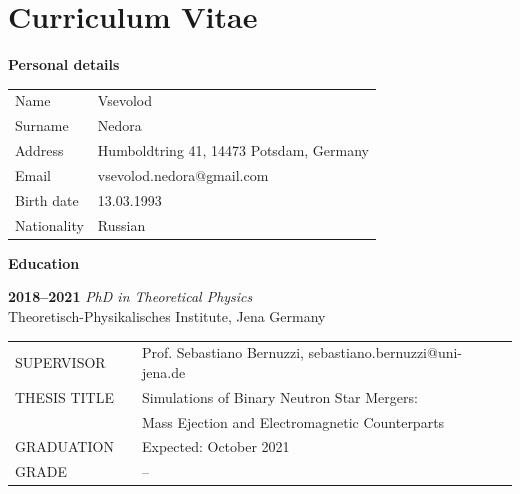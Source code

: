 \documentclass[
openright,
12pt, %
english,%
onehalfspacing, %
nolistspacing, %
nohyperref, %
headsepline, %
]{MastersDoctoralThesis} %
\begin{document}
\newpage 
\pagestyle{plain}
\section*{Curriculum Vitae}

\vspace*{1cm}
\noindent \textbf{Personal details} 
\vspace*{-0.2cm}

\begin{table}[h!]
    \begin{small}
     \begin{tabular}{ll}
        Name        & Vsevolod  \\
        Surname     & Nedora \\
        Address     & Humboldtring 41, 14473 Potsdam, Germany \\
        Email       & vsevolod.nedora$@$gmail.com \\
        Birth date  & 13.03.1993 \\
        Nationality & Russian \\
    \end{tabular}
    \end{small}
\end{table}

\vspace*{0.2cm}
\noindent


\noindent \textbf{Education}
\vspace*{-0.2cm}


\noindent \textbf{2018--2021} \textit{PhD in Theoretical Physics} \\
Theoretisch-Physikalisches Institute, Jena Germany \\
\begin{tabular}{l l l}
    \hspace{3mm}S\footnotesize{UPERVISOR}   & \hspace{2mm} & Prof. Sebastiano Bernuzzi, sebastiano.bernuzzi@uni-jena.de \\
    \hspace{3mm}T\footnotesize{HESIS TITLE} & \hspace{2mm} & Simulations of Binary Neutron Star Mergers: \\  
                                            & \hspace{2mm} & Mass Ejection and Electromagnetic Counterparts \\
    \hspace{3mm}G\footnotesize{RADUATION}   & \hspace{2mm} & Expected: October 2021 \\
    \hspace{3mm}G\footnotesize{RADE}        & \hspace{2mm} & -- \\
\end{tabular}
\end{document}
